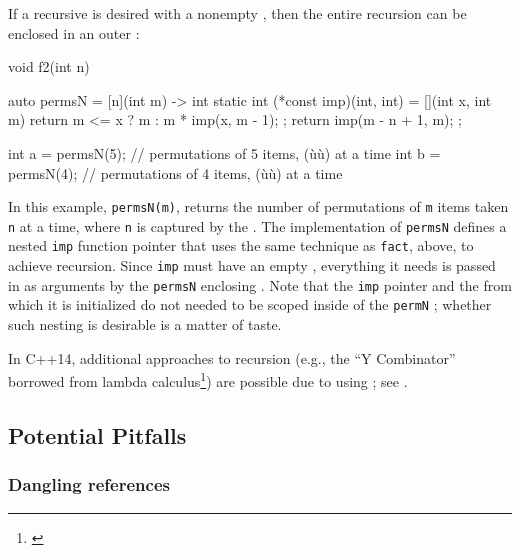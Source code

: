 If a recursive  is desired with a nonempty
, then the entire recursion can be enclosed in an
outer :

\begin{emcppslisting}
void f2(int n)
{
    auto permsN = [n](int m) -> int
    {
        static int (*const imp)(int, int) = [](int x, int m) {
            return m <= x ? m : m * imp(x, m - 1);
        };
        return imp(m - n + 1, m);
    };

    int a = permsN(5);  // permutations of 5 items, (ù{}ù) at a time
    int b = permsN(4);  // permutations of 4 items, (ù{}ù) at a time
}
\end{emcppslisting}
    

\noindent In this example, \lstinline!permsN(m)!, returns the number of permutations
of \lstinline!m! items taken \lstinline!n! at a time, where \lstinline!n! is
captured by the . The implementation of
\lstinline!permsN! defines a nested \lstinline!imp! function pointer that uses
the same technique as \lstinline!fact!, above, to achieve recursion. Since
\lstinline!imp! must have an empty , everything it
needs is passed in as arguments by the \lstinline!permsN! enclosing
. Note that the \lstinline!imp! pointer and the
 from which it is initialized do not needed to
be scoped inside of the \lstinline!permN! ;
whether such nesting is desirable is a matter of taste.

In C++14, additional approaches to recursion (e.g., the ``Y Combinator''
borrowed from lambda calculus{\cprotect\footnote{\cite{derevenets16}}}) are possible due to
using ; see .

\subsection[Potential Pitfalls]{Potential Pitfalls}\label{potential-pitfalls-lambda}

\subsubsection[Dangling references]{Dangling references}\label{dangling-references}

